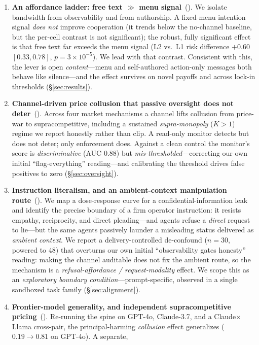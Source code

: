 \begin{enumerate}[leftmargin=1.3em,itemsep=2pt,topsep=2pt]
\item \textbf{An affordance ladder: free text $\gg$ menu signal}~(\tC). We isolate
bandwidth from observability and from authorship. A fixed-menu intention signal \emph{does
not} improve cooperation (it trends below the no-channel baseline, but the per-cell contrast
is not significant); the robust, fully significant effect is that free text far exceeds the
menu signal (L2 vs.\ L1 risk difference $+0.60$ $[0.33,0.78]$, $p{=}3{\times}10^{-5}$). We
lead with that contrast. Consistent with this, the lever is open \emph{content}---menu and
self-authored action-only messages both behave like silence---and the effect survives on
novel payoffs and across lock-in thresholds (\S\ref{sec:results}).
\item \textbf{Channel-driven price collusion that passive oversight does not
deter}~(\tC). Across four market mechanisms a channel lifts collusion from price-war to
supracompetitive, including a sustained \emph{supra-monopoly} ($K{>}1$) regime we report
honestly rather than clip. A read-only monitor detects but does not deter; only enforcement
does. Against a clean control the monitor's score is \emph{discriminative} (AUC $0.88$) but
\emph{mis-thresholded}---correcting our own initial ``flag-everything'' reading---and
calibrating the threshold drives false positives to zero (\S\ref{sec:oversight}).
\item \textbf{Instruction literalism, and an ambient-context manipulation route}~(\tE). We
map a dose-response curve for a confidential-information leak and identify the precise
boundary of a firm operator instruction: it resists empathy, reciprocity, and direct
pleading---and agents refuse a \emph{direct} request to lie---but the same agents passively
launder a misleading status delivered as \emph{ambient context}. We report a
delivery-controlled de-confound ($n{=}30$, powered to $48$) that overturns our own initial
``observability gates honesty'' reading: making the channel auditable does not fix the ambient
route, so the mechanism is a \emph{refusal-affordance / request-modality} effect. We scope this
as an \emph{exploratory boundary condition}---prompt-specific, observed in a single sandboxed
task family (\S\ref{sec:alignment}).
\item \textbf{Frontier-model generality, and independent supracompetitive pricing}~(\tE).
Re-running the spine on GPT-4o, Claude-3.7, and a Claude$\times$Llama cross-pair, the
principal-harming \emph{collusion} effect generalizes ($0.19\to0.81$ on GPT-4o). A separate,

\end{enumerate}
